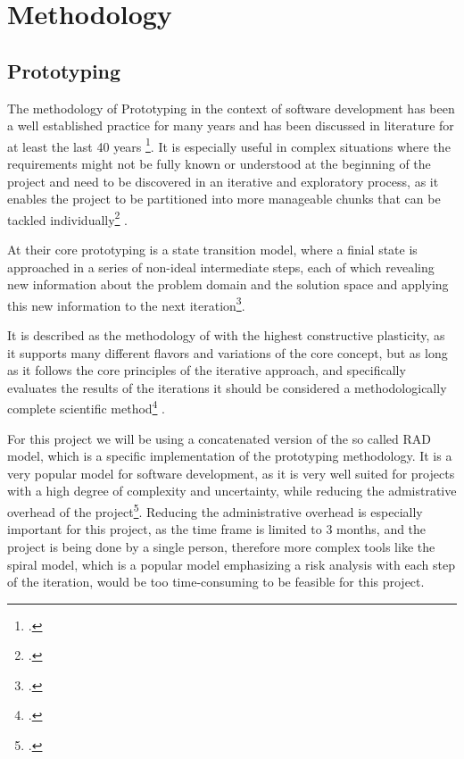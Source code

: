 \chapter{Methodology}
\label{methodology}

\section{Prototyping}


The methodology of Prototyping in the context of software development has been a well established practice for many years and
has been discussed in literature for at least the last 40 years \footcite{gomaaImpactRapidPrototyping1983}.
It is especially useful in complex situations where the requirements might not be fully known or understood at the beginning of the project
and need to be discovered in an iterative and exploratory process, 
as it enables the project to be partitioned into more manageable chunks that can be tackled individually\footcite{naumannPrototypingNewParadigm1982} .

At their core prototyping is a state transition model, where a finial state is approached in a series of non-ideal intermediate steps,
each of which revealing new information about the problem domain and the solution space and applying this new information to the next iteration\footcite{kraushaarPrototypingMethodApplications1985}.

It is described as the methodology of with the highest constructive plasticity, as it supports many different flavors and variations of the core concept,
but as long as it follows the core principles of the iterative approach, and specifically evaluates the results of the iterations it should be considered a methodologically complete scientific method\footcite{wildeMethodenspektrumWirtschaftsinformatikUeberblick} .

For this project we will be using a concatenated version of the so called \ac{RAD} model, which is a specific implementation of the prototyping methodology.
It is a very popular model for software development, as it is very well suited for projects with a high degree of complexity and uncertainty, while reducing the admistrative overhead of the project\footcite{martinRapidApplicationDevelopment1991}.
Reducing the administrative overhead is especially important for this project, as the time frame is limited to 3 months, and the project is being done by a single person, 
therefore more complex tools like the spiral model, which is a popular model emphasizing a risk analysis with each step of the iteration, 
would be too time-consuming to be feasible for this project.

